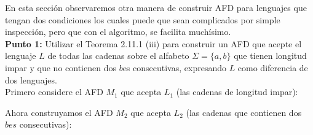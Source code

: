 
En esta sección observaremos otra manera de construir AFD para lenguajes que tengan dos condiciones los cuales puede que sean complicados por simple inspección, pero que con el algoritmo, se facilita muchísimo.\\

\textbf{Punto 1: }Utilizar el Teorema 2.11.1 (iii) para construir un AFD que acepte el lenguaje $L$ de todas las cadenas sobre el alfabeto $\Sigma=\{a,b\}$ que tienen longitud impar y que no contienen dos $b$es consecutivas, expresando $L$ como diferencia de dos lenguajes.\\

Primero considere el AFD $M_1$ que acepta $L_1$ (las cadenas de longitud impar):
\begin{basedtikz}
\centering
\end{basedtikz}
Ahora construyamos el AFD $M_2$ que acepta $L_2$ (las cadenas que contienen dos $bes$ consecutivas):
\begin{basedtikz}
\centering
\end{basedtikz}

